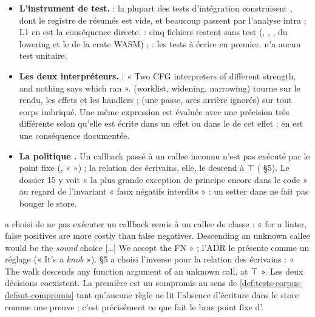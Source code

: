 \begin{itemize}
\item \textbf{L'instrument de test.}  : la plupart des tests d'intégration construisent , dont le registre de résumés est vide, et beaucoup passent par l'analyse intra ; L1 en est la conséquence directe.  : cinq fichiers restent sans test (, , ,  du lowering et le  de la crate WASM) ;  : les tests à écrire en premier.  n'a aucun test unitaire.
\item \textbf{Les deux interpréteurs.}  : « Two CFG interpreters of different strength, and nothing says which ran ».  (worklist, widening, narrowing) tourne sur le rendu, les effets et les handlers ;  (une passe, arcs arrière ignorés) sur tout corps imbriqué. Une même expression est évaluée avec une précision très différente selon qu'elle est écrite dans un effet ou dans le  de cet effet ;  en est une conséquence documentée.
\item \textbf{La politique .} Un callback passé à un callee inconnu n'est pas exécuté par le point fixe (, «  ») ; la relation des écrivains, elle, le descend à ⊤ ( §5). Le dossier 15 y voit « la plus grande exception de principe encore dans le code » au regard de l'invariant « faux négatifs interdits » : un setter dans  ne fait pas bouger le store.
\end{itemize}

\begin{decision}
 a choisi de ne pas exécuter un callback remis à un callee de classe  : « for a linter, false positives are more costly than false negatives. Descending an unknown callee would be the \emph{sound} choice […] We accept the FN » ; l'ADR le présente comme un réglage (« It's a \emph{knob} »).  §5 a choisi l'inverse pour la relation des écrivains : « The walk descends any function argument of an unknown call, at ⊤ ». Les deux décisions coexistent. La première est un compromis au sens de \cref{def:tests-corpus-defaut-compromis} tant qu'aucune règle ne lit l'absence d'écriture dans le store comme une preuve ; c'est précisément ce que fait le bras point fixe d'.
\end{decision}


